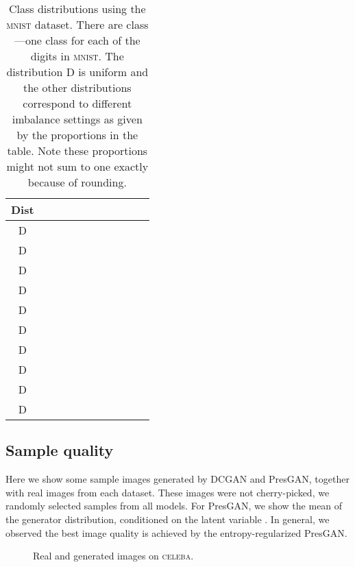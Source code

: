 \documentclass[11pt]{article}
\begin{document}
\begin{table*}[!hbpt]
\centering
\caption{Class distributions using the \textsc{mnist} dataset. There are  class---one class for each of 
the  digits in \textsc{mnist}. The distribution D is uniform and the other distributions correspond 
to different imbalance settings as given by the proportions in the table. Note these proportions might not sum to one exactly because of rounding.}
\begin{tabular}[\textwidth]{ccccccccccc}
\toprule
Dist &  &  &   &  &  &    &    &    &   &   \\
\midrule
D &   &  &  &  &  &  &  &  &  &  \\
D &   &  &  &  &  &  &  &  &  &    \\
D &  &  &   &   &   &   &   &   &  &      \\
D &   &  &  &   &    &   &    &    &   &   \\
D &   &  &  &   &  &  &  &  &  &    \\
D &   & &   &  &   &  &  &  &  &  \\
D &  &  &  &   &  &   &  &  &  &    \\
D &   &  &   &   &  &   &  &   &  &   \\
D &   &  &  &   &  &   &  &   &    &   \\
D & &  &   &   &  &  & &   &    &    \\
\bottomrule
\end{tabular}
\label{supp_tab:class_dist}
\end{table*}

\subsection{Sample quality}\label{app:samples}

Here we show some sample images generated by \acrshort{DCGAN} and Pres\acrshort{GAN}, together with real images from each dataset. These images were not cherry-picked, we randomly selected samples from all models. For Pres\acrshort{GAN}, we show the mean of the generator distribution, conditioned on the latent variable .
In general, we observed the best image quality is achieved by the entropy-regularized Pres\acrshort{GAN}.

\newpage


\begin{figure}[t]
	\centering
	\caption{Real and generated images on \textsc{celeba}.}
	\label{supp_fig:images_celeba}
\end{figure}

 
\end{document}
